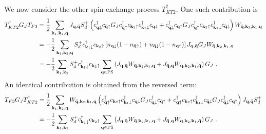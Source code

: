 We now consider the other spin-exchange process \(T_{KT2}^\dagger\). One such contribution is
\begin{equation}\begin{aligned}\label{kondoRenorm3}
	T_{KT2}^\dagger G_J T_{F3} &= \frac{1}{2}\sum_{{\bf k}_1,{\bf k}_2,{\bf q}} J_{{\bf q}, {\bf \bar q}}S_d^+ \left(c^\dagger_{{\bf q}\downarrow}c_{{\bf \bar q}\uparrow} G_J c^\dagger_{{\bf \bar q} \uparrow} c_{{\bf k}_2 \uparrow} c^\dagger_{{\bf k}_1 \downarrow} c_{{\bf q} \downarrow} + c^\dagger_{{\bf \bar q}\downarrow}c_{{\bf q}\uparrow}  G_J  c^\dagger_{{\bf q} \uparrow} c_{{\bf k}_2 \uparrow} c^\dagger_{{\bf k}_1 \downarrow} c_{{\bf \bar q} \downarrow}\right)W_{{\bf \bar q}, {\bf k}_2, {\bf k}_1, {\bf q}}\\
							   &= -\frac{1}{2}\sum_{{\bf k}_1,{\bf k}_2,{\bf q}} S_d^+ c^\dagger_{{\bf k}_1 \downarrow} c_{{\bf k}_2 \uparrow}\left[n_{{\bf q}\downarrow}(1 - n_{{\bf \bar q}\uparrow}) + n_{{\bf \bar q}\downarrow}(1 - n_{{\bf q}\uparrow}) \right] J_{{\bf q}, {\bf \bar q}} G_J W_{{\bf \bar q}, {\bf k}_2, {\bf k}_1, {\bf q}}\\
							   &= -\frac{1}{2}\sum_{{\bf k}_1,{\bf k}_2} S_d^+ c^\dagger_{{\bf k}_1 \downarrow} c_{{\bf k}_2 \uparrow}\sum_{{\bf q} \in \text{PS}}\left(J_{{\bf q}, {\bf \bar q}} W_{{\bf \bar q}, {\bf k}_2, {\bf k}_1, {\bf q}} + J_{{\bf \bar q}, {\bf q}} W_{{\bf q}, {\bf k}_2, {\bf k}_1, {\bf \bar q}}\right)G_J~.
\end{aligned}\end{equation}
An identical contribution is obtained from the reversed term:
\begin{equation}\begin{aligned}\label{kondoRenorm4}
	T_{F3}G_J T_{KT2}^\dagger  &= \frac{1}{2}\sum_{{\bf k}_1,{\bf k}_2,{\bf q}} W_{{\bf \bar q}, {\bf k}_2, {\bf k}_1, {\bf q}}\left(c^\dagger_{{\bf \bar q} \uparrow} c_{{\bf k}_2 \uparrow} c^\dagger_{{\bf k}_1 \downarrow} c_{{\bf q} \downarrow} G_J c^\dagger_{{\bf q}\downarrow}c_{{\bf \bar q}\uparrow} +  c^\dagger_{{\bf q} \uparrow} c_{{\bf k}_2 \uparrow} c^\dagger_{{\bf k}_1 \downarrow} c_{{\bf \bar q} \downarrow} G_J c^\dagger_{{\bf \bar q}\downarrow}c_{{\bf q}\uparrow} \right)J_{{\bf q}, {\bf \bar q}}S_d^+ \\
							   &= -\frac{1}{2}\sum_{{\bf k}_1,{\bf k}_2} S_d^+ c^\dagger_{{\bf k}_1 \downarrow} c_{{\bf k}_2 \uparrow}\sum_{{\bf q} \in \text{PS}}\left(J_{{\bf q}, {\bf \bar q}} W_{{\bf \bar q}, {\bf k}_2, {\bf k}_1, {\bf q}} + J_{{\bf \bar q}, {\bf q}} W_{{\bf q}, {\bf k}_2, {\bf k}_1, {\bf \bar q}}\right)G_J~.
\end{aligned}\end{equation}

